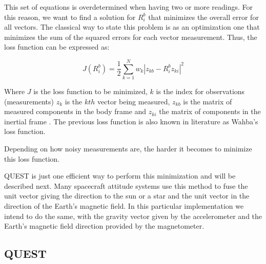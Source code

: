 \documentclass[a4paper,10pt]{article}
\begin{document}
This set of equations is overdetermined when having two or more readings. For this reason, we want to find a solution for $R^b_i$ that minimizes the overall error for all vectors. The classical way to state this problem is as an optimization one that minimizes the sum of the squared errors for each vector measurement. Thus, the loss function can be expressed as:

\begin{equation}
 J(R^b_i) = \frac{1}{2}  \sum^{N}_{k=1}  w_k \left| z_{kb} - R^b_i z_{ki} \right|^2 
\end{equation}

Where $J$ is the loss function to be minimized, $k$ is the index for observations (measurements) $z_{k}$ is the $kth$ vector being measured, $z_{kb}$ is the matrix of measured components in the body frame and $z_{ki}$ the matrix of components in the inertial frame \cite{HallNotes2003}. The previous loss function is also known in literature as Wahba's loss function. 

Depending on how noisy measurements are, the harder it becomes to minimize this loss function. 

QUEST is just one efficient way to perform this minimization and will be described next. Many spacecraft attitude systems use this method to fuse the unit vector giving the direction to the sun or a star and the unit vector in the direction of the Earth's magnetic field. In this particular implementation we intend to do the same, with the gravity vector given by the accelerometer and the Earth's magnetic field direction provided by the magnetometer.

\subsection{QUEST}


 

\end{document}
